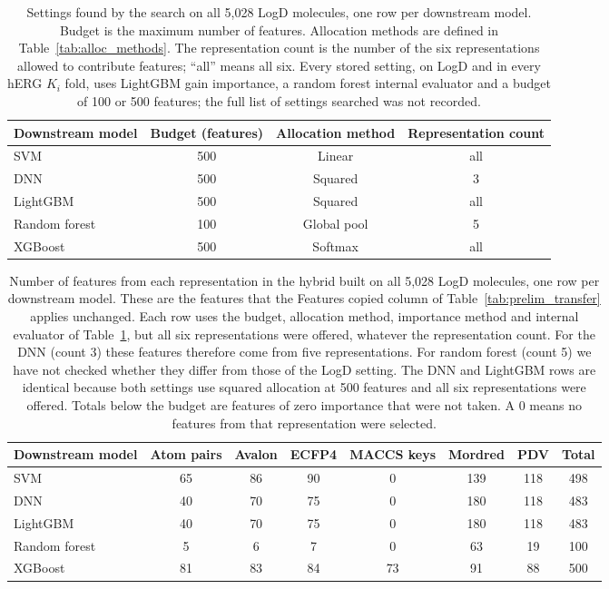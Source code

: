 \begin{table}[htbp]
\centering
\small
\begin{tabular}{@{}lccc@{}}
\toprule
Downstream model & Budget (features) & Allocation method & Representation count \\
\midrule
SVM & 500 & Linear & all \\
DNN & 500 & Squared & 3 \\
LightGBM & 500 & Squared & all \\
Random forest & 100 & Global pool & 5 \\
XGBoost & 500 & Softmax & all \\
\bottomrule
\end{tabular}
\caption[Search settings found on LogD.]{Settings found by the search on all 5,028 LogD molecules, one row per downstream model. Budget is the maximum number of features. Allocation methods are defined in Table~\ref{tab:alloc_methods}. The representation count is the number of the six representations allowed to contribute features; ``all'' means all six. Every stored setting, on LogD and in every hERG $K_i$ fold, uses LightGBM gain importance, a random forest internal evaluator and a budget of 100 or 500 features; the full list of settings searched was not recorded.}
\label{tab:prelim_transfer_settings}
\end{table}

\begin{table}[htbp]
\centering
\small
\begin{tabular}{@{}lccccccc@{}}
\toprule
Downstream model & Atom pairs & Avalon & ECFP4 & MACCS keys & Mordred & PDV & Total \\
\midrule
SVM & 65 & 86 & 90 & 0 & 139 & 118 & 498 \\
DNN & 40 & 70 & 75 & 0 & 180 & 118 & 483 \\
LightGBM & 40 & 70 & 75 & 0 & 180 & 118 & 483 \\
Random forest & 5 & 6 & 7 & 0 & 63 & 19 & 100 \\
XGBoost & 81 & 83 & 84 & 73 & 91 & 88 & 500 \\
\bottomrule
\end{tabular}
\caption[Features selected on LogD and copied to hERG $K_i$.]{Number of features from each representation in the hybrid built on all 5,028 LogD molecules, one row per downstream model. These are the features that the Features copied column of Table~\ref{tab:prelim_transfer} applies unchanged. Each row uses the budget, allocation method, importance method and internal evaluator of Table~\ref{tab:prelim_transfer_settings}, but all six representations were offered, whatever the representation count. For the DNN (count 3) these features therefore come from five representations. For random forest (count 5) we have not checked whether they differ from those of the LogD setting. The DNN and LightGBM rows are identical because both settings use squared allocation at 500 features and all six representations were offered. Totals below the budget are features of zero importance that were not taken. A 0 means no features from that representation were selected.}
\label{tab:prelim_transfer_features}
\end{table}

